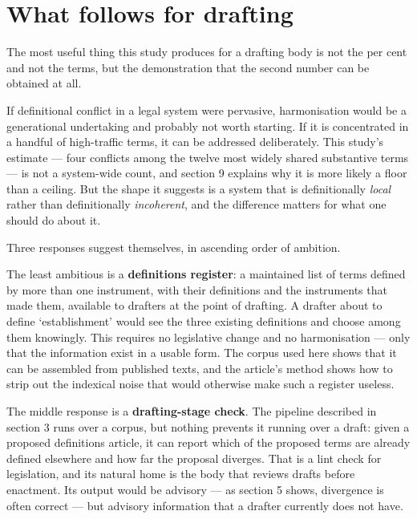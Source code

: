 \documentclass[11pt]{article}
\begin{document}
\section{What follows for drafting}

The most useful thing this study produces for a drafting body is not the
\nDivergentShare{} per cent and not the \nConflicting{} terms, but the demonstration that the second
number can be obtained at all.

If definitional conflict in a legal system were pervasive, harmonisation
would be a generational undertaking and probably not worth starting. If it is
concentrated in a handful of high-traffic terms, it can be addressed
deliberately. This study's estimate --- four conflicts among the twelve most
widely shared substantive terms --- is not a system-wide count, and section 9
explains why it is more likely a floor than a ceiling. But the shape it
suggests is a system that is definitionally \emph{local} rather than
definitionally \emph{incoherent}, and the difference matters for what one
should do about it.

Three responses suggest themselves, in ascending order of ambition.

The least ambitious is a \textbf{definitions register}: a maintained list of
terms defined by more than one instrument, with their definitions and the
instruments that made them, available to drafters at the point of drafting. A
drafter about to define `establishment' would see the three existing
definitions and choose among them knowingly. This requires no legislative
change and no harmonisation --- only that the information exist in a usable
form. The corpus used here shows that it can be assembled from published
texts, and the article's method shows how to strip out the indexical noise
that would otherwise make such a register useless.

The middle response is a \textbf{drafting-stage check}. The pipeline
described in section 3 runs over a corpus, but nothing prevents it running
over a draft: given a proposed definitions article, it can report which of
the proposed terms are already defined elsewhere and how far the proposal
diverges. That is a lint check for legislation, and its natural home is the
body that reviews drafts before enactment. Its output would be advisory --- as
section 5 shows, divergence is often correct --- but advisory information
that a drafter currently does not have.
\end{document}
